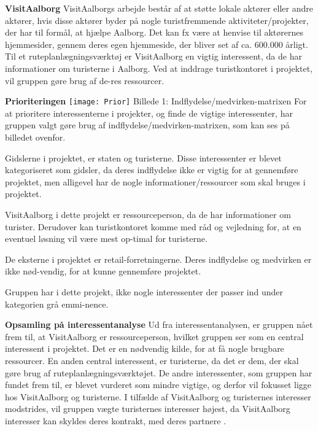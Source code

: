 \textbf{VisitAalborg}\newline
VisitAalborgs arbejde består af at støtte lokale aktører eller andre aktører, hvis disse aktører byder på nogle turistfremmende aktiviteter/projekter, der har til formål, at hjælpe Aalborg. Det kan fx være at henvise til aktørernes hjemmesider, gennem deres egen hjemmeside, der bliver set af ca. 600.000 årligt. \citep{VA}
Til et ruteplanlægningsværktøj er VisitAalborg en vigtig interessent, da de har informationer om turisterne i Aalborg. Ved at inddrage turistkontoret i projektet, vil gruppen gøre brug af de-res ressourcer. 

\textbf{Prioriteringen}\newline
\texttt{[image: Prior]}
Billede 1: Indflydelse/medvirken-matrixen
For at prioritere interessenterne i projekter, og finde de vigtige interessenter, har gruppen valgt gøre brug af indflydelse/medvirken-matrixen, som kan ses på billedet ovenfor. 

Gidslerne i projektet, er staten og turisterne. Disse interessenter er blevet kategoriseret som gidsler, da deres indflydelse ikke er vigtig for at gennemføre projektet, men alligevel har de nogle informationer/ressourcer som skal bruges i projektet.

VisitAalborg i dette projekt er ressourceperson, da de har informationer om turister. Derudover kan turistkontoret komme med råd og vejledning for, at en eventuel løsning vil være mest op-timal for turisterne.   

De eksterne i projektet er retail-forretningerne. Deres indflydelse og medvirken er ikke nød-vendig, for at kunne gennemføre projektet. 

Gruppen har i dette projekt, ikke nogle interessenter der passer ind under kategorien grå emmi-nence. 

\textbf{Opsamling på interessentanalyse}\newline
Ud fra interessentanalysen, er gruppen nået frem til, at VisitAalborg er ressourceperson, hvilket gruppen ser som en central interessent i projektet. Det er en nødvendig kilde, for at få nogle brugbare ressourcer. En anden central interessent, er turisterne, da det er dem, der skal gøre brug af ruteplanlægningsværktøjet. 
De andre interessenter, som gruppen har fundet frem til, er blevet vurderet som mindre vigtige, og derfor vil fokusset ligge hos VisitAalborg og turisterne. 
I tilfælde af VisitAalborg og turisternes interesser modstrides, vil gruppen vægte turisternes interesser højest, da VisitAalborg interesser kan skyldes deres kontrakt, med deres partnere \citep{VA}. 




